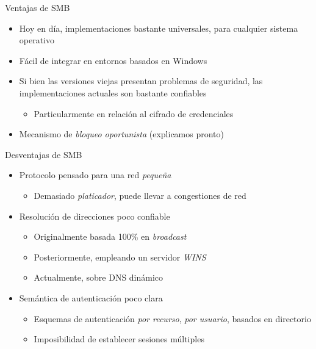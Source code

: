 \documentclass[presentation]{beamer}
\newcommand{\rarrow}{$\rightarrow$\hskip 0.5em}
\begin{document}
\begin{frame}[label={sec:orgf48928a}]{Ventajas de SMB}
\begin{itemize}
\item Hoy en día, implementaciones bastante universales, para cualquier
sistema operativo
\item Fácil de integrar en entornos basados en Windows
\item Si bien las versiones viejas presentan problemas de seguridad, las
implementaciones actuales son bastante confiables
\begin{itemize}
\item Particularmente en relación al cifrado de credenciales
\end{itemize}
\item Mecanismo de \emph{bloqueo oportunista} (explicamos pronto)
\end{itemize}
\end{frame}

\begin{frame}[label={sec:orgeef95c9}]{Desventajas de SMB}
\begin{itemize}
\item Protocolo pensado para una red \emph{pequeña}
\begin{itemize}
\item Demasiado \emph{platicador}, puede llevar a congestiones de red
\end{itemize}
\item Resolución de direcciones poco confiable
\begin{itemize}
\item Originalmente basada 100\% en \emph{broadcast}
\item Posteriormente, empleando un servidor \emph{WINS}
\item Actualmente, sobre DNS dinámico
\end{itemize}
\item Semántica de autenticación poco clara
\begin{itemize}
\item Esquemas de autenticación \emph{por recurso}, \emph{por usuario}, basados
en directorio
\item Imposibilidad de establecer sesiones múltiples
\end{itemize}
\end{itemize}
\end{frame}
\end{document}
